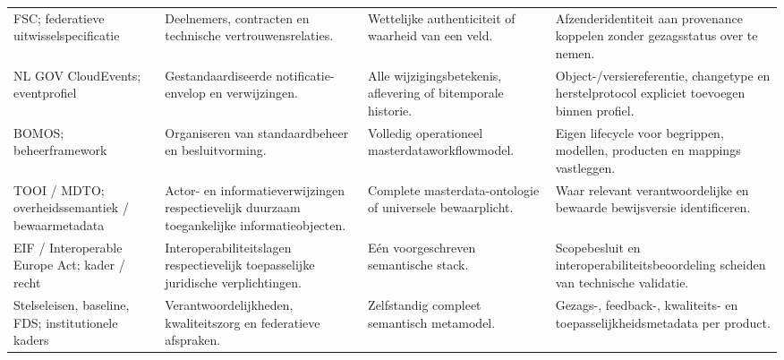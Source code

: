 \begin{longtable}{@{}P{.22\linewidth}P{.22\linewidth}P{.24\linewidth}P{.24\linewidth}@{}}
FSC; federatieve uitwissel\-specificatie \citep{S21} & Deelnemers, contracten en technische vertrouwensrelaties. & Wettelijke authenticiteit of waarheid van een veld. & Afzenderidentiteit aan provenance koppelen zonder gezagsstatus over te nemen. \\
NL GOV CloudEvents; eventprofiel \citep{S22} & Gestandaardiseerde notificatie-envelop en verwijzingen. & Alle wijzigingsbetekenis, aflevering of bitemporale historie. & Object-/versiereferentie, changetype en herstelprotocol expliciet toevoegen binnen profiel. \\
BOMOS; beheerframework \citep{S23} & Organiseren van standaardbeheer en besluitvorming. & Volledig operationeel masterdataworkflowmodel. & Eigen lifecycle voor begrippen, modellen, producten en mappings vastleggen. \\
TOOI / MDTO; overheidssemantiek / bewaarmetadata \citep{S15,S24} & Actor- en informatieverwijzingen respectievelijk duurzaam toegankelijke informatieobjecten. & Complete masterdata-ontologie of universele bewaarplicht. & Waar relevant verantwoordelijke en bewaarde bewijsversie identificeren. \\
EIF / Interoperable Europe Act; kader / recht \citep{S43,S42} & Interoperabiliteits\-lagen respectievelijk toepasselijke juridische verplichtingen. & Eén voorgeschreven semantische stack. & Scopebesluit en interoperabiliteitsbeoordeling scheiden van technische validatie. \\
Stelseleisen, baseline, FDS; institutionele kaders \citep{S25,S26,S27} & Verantwoordelijk\-heden, kwaliteitszorg en federatieve afspraken. & Zelfstandig compleet semantisch metamodel. & Gezags-, feedback-, kwaliteits- en toepasselijkheidsmetadata per product. \\
\bottomrule
\end{longtable}
\endgroup